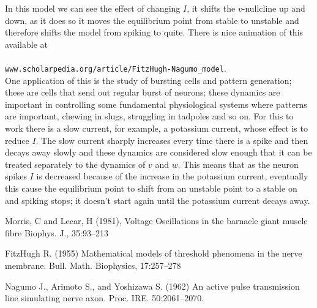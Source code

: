 \documentclass[11pt,a4paper]{scrartcl}
\begin{document}
In this model we can see the effect of changing $I$, it shifts the
$v$-nullcline up and down, as it does so it moves the equilibrium
point from stable to unstable and therefore shifts the model from
spiking to quite. There is nice animation of this available at\\
\\
\texttt{www.scholarpedia.org/article/FitzHugh-Nagumo\_model}. \\

One application of this is the study of bursting cells and pattern
generation; these are cells that send out regular burst of neurons;
these dynamics are important in controlling some fundamental
physiological systems where patterns are important, chewing in slugs,
struggling in tadpoles and so on. For this to work there is a slow
current, for example, a potassium current, whose effect is to reduce
$I$. The slow current sharply increases every time there is a spike and
then decays away slowly and these dynamics are considered slow enough
that it can be treated separately to the dynamics of $v$ and $w$. This
means that as the neuron spikes $I$ is decreased because of the
increase in the potassium current, eventually this cause the
equilibrium point to shift from an unstable point to a stable on and
spiking stops; it doesn't start again until the potassium current decays away.

\begin{thebibliography}{99}
\newblock Morris, C and Lecar, H (1981),
\newblock Voltage Oscillations in the barnacle giant muscle fibre
\newblock Biophys. J., 35:93--213

\newblock FitzHugh R. (1955) 
\newblock Mathematical models of threshold phenomena in the nerve membrane. 
\newblock Bull. Math. Biophysics, 17:257--278

\newblock Nagumo J., Arimoto S., and Yoshizawa S. (1962) 
\newblock An active pulse transmission line simulating nerve axon. 
\newblock Proc. IRE. 50:2061--2070.

\end{thebibliography}
\end{document}
